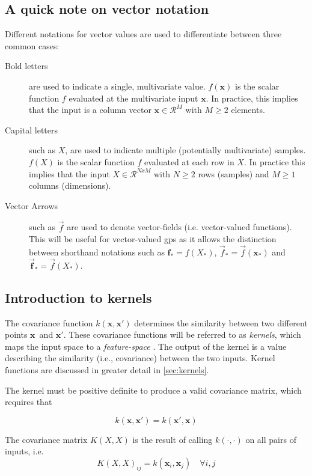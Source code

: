 \subsection{A quick note on vector notation}
Different notations for vector values are used to differentiate between three common cases:
\begin{description}
\item[Bold letters] are used to indicate a single, multivariate value. $f(\boldsymbol{x})$ is the scalar function $f$ evaluated at the multivariate input $\boldsymbol{x}$. In practice, this implies that the input is a column vector $\boldsymbol{x} \in \mathcal{R}^{M}$ with $M \geq 2$ elements. 
\item[Capital letters] such as $X$, are used to indicate multiple (potentially multivariate) samples. $f(X)$ is the scalar function $f$ evaluated at each row in $X$. In practice this implies that the input $X \in \mathcal{R}^{N x M}$ with $N \geq 2$ rows (samples) and $M \geq 1$ columns (dimensions).
\item[Vector Arrows] such as $\vec{f}$ are used to denote vector-fields (i.e. vector-valued functions). This will be useful for vector-valued \acrshort{gp}s as it allows the distinction between shorthand notations such as $\boldsymbol{f}_* = f(X_*)$, $\vec{f}_* = \vec{f}(\boldsymbol{x}_*)$ and $\vec{\boldsymbol{f}}_* = \vec{f}(X_*)$.
\end{description}

\subsection{Introduction to kernels}
The covariance function $k(\boldsymbol{x}, \boldsymbol{x}')$ determines the similarity between two different points $\boldsymbol{x}$ and $\boldsymbol{x}'$. These covariance functions will be referred to as \textit{kernels}, which maps the input space to a \textit{feature-space} \cite{rasmussen}. The output of the kernel is a value describing the similarity (i.e., covariance) between the two inputs. Kernel functions are discussed in greater detail in \cref{sec:kernels}.

The kernel must be positive definite to produce a valid covariance matrix, which requires that

\begin{equation}
    k(\boldsymbol{x}, \boldsymbol{x}') = k(\boldsymbol{x}', \boldsymbol{x})
\end{equation}

The covariance matrix $K(X, X)$ is the result of calling $k(\cdot, \cdot)$ on all pairs of inputs, i.e.
\begin{equation} 
    K(X, X)_{ij} = k(\boldsymbol{x}_i, \boldsymbol{x}_j) \quad \forall i, j
\end{equation}

